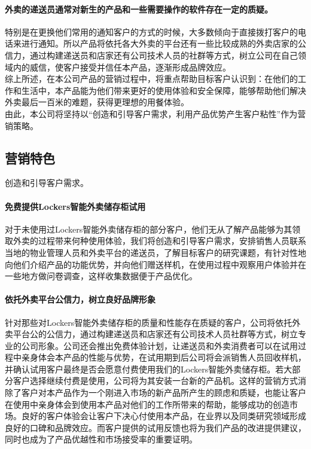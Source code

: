 \documentclass[violet]{main}
\begin{document}
				\paragraph{外卖的递送员通常对新生的产品和一些需要操作的软件存在一定的质疑。}
					特别是在更换他们常用的通知客户的方式的时候，大多数倾向于直接拨打客户的电话来进行通知。所以产品将依托各大外卖的平台还有一些比较成熟的外卖店家的公信力，通过构建递送员和店家还有公司技术人员的社群等方式，树立公司在自己领域内的威信，使客户接受并信任本产品，逐渐形成品牌效应。 
					\\\indent 综上所述，在本公司产品的营销过程中，将重点帮助目标客户认识到：在他们的工作和生活中，本产品能为他们带来更好的使用体验和安全保障，能够帮助他们解决外卖最后一百米的难题，获得更理想的用餐体验。
					\\\indent 由此，本公司将坚持以“创造和引导客户需求，利用产品优势产生客户粘性”作为营销策略。
			\subsection{营销特色}
				创造和引导客户需求。
				\paragraph{免费提供Lockers智能外卖储存柜试用}
					对于未使用过Lockers智能外卖储存柜的部分客户，他们无从了解产品能够为其领取外卖的过程带来何种使用体验，我们将创造和引导客户需求，安排销售人员联系当地的物业管理人员和外卖平台的递送员，了解目标客户的研究课题，有针对性地向他们介绍产品的功能优势，并向他们赠送样机，在使用过程中观察用户体验并在一些地方做问卷调查，这样收集数据便于产品优化。
				\paragraph{依托外卖平台公信力，树立良好品牌形象}
					针对那些对Lockers智能外卖储存柜的质量和性能存在质疑的客户，公司将依托外卖平台公的公信力，通过构建递送员和店家还有公司技术人员社群等方式，树立专业的公司形象。公司还会推出免费体验计划，让递送员和外卖消费者可以在试用过程中亲身体会本产品的性能与优势，在试用期到后公司将会派销售人员回收样机，并确认试用客户最终是否会愿意付费使用我们的Lockers智能外卖储存柜。若大部分客户选择继续付费是使用，公司将为其安装一台新的产品机。这样的营销方式消除了客户对本产品作为一个刚进入市场的新产品所产生的顾虑和质疑，也能让客户在使用中亲身体会到使用本产品对他们的工作所带来的帮助，能够成功的创造市场。良好的客户体验会让客户下决心付使用本产品，在业界以及同类研究领域形成良好的口碑和品牌效应。而客户提供的试用反馈也将为我们产品的改进提供建议，同时也成为了产品优越性和市场接受率的重要证明。
\end{document}
